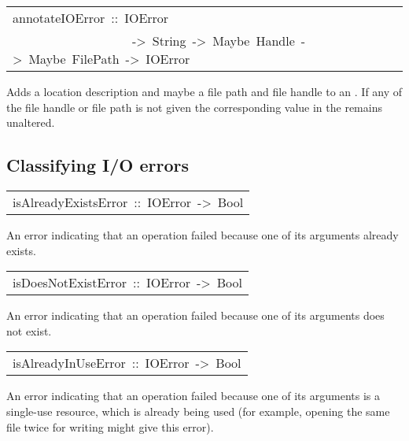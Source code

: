 \begin{haddockdesc}
\item[\begin{tabular}{@{}l}
annotateIOError\ ::\ IOError\\\ \ \ \ \ \ \ \ \ \ \ \ \ \ \ \ \ \ \ ->\ String\ ->\ Maybe\ Handle\ ->\ Maybe\ FilePath\ ->\ IOError
\end{tabular}]\haddockbegindoc
Adds a location description and maybe a file path and file handle
 to an .  If any of the file handle or file path is not given
 the corresponding value in the  remains unaltered.
\par

\end{haddockdesc}
\subsection{Classifying I/O errors
}
\begin{haddockdesc}
\item[\begin{tabular}{@{}l}
isAlreadyExistsError\ ::\ IOError\ ->\ Bool
\end{tabular}]\haddockbegindoc
An error indicating that an  operation failed because
 one of its arguments already exists.
\par

\end{haddockdesc}
\begin{haddockdesc}
\item[\begin{tabular}{@{}l}
isDoesNotExistError\ ::\ IOError\ ->\ Bool
\end{tabular}]\haddockbegindoc
An error indicating that an  operation failed because
 one of its arguments does not exist.
\par

\end{haddockdesc}
\begin{haddockdesc}
\item[\begin{tabular}{@{}l}
isAlreadyInUseError\ ::\ IOError\ ->\ Bool
\end{tabular}]\haddockbegindoc
An error indicating that an  operation failed because
 one of its arguments is a single-use resource, which is already
 being used (for example, opening the same file twice for writing
 might give this error).
\par

\end{haddockdesc}
